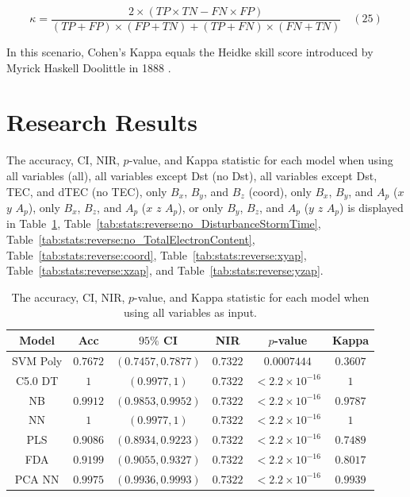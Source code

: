\documentclass[sn-mathphys-num]{sn-jnl}%
\begin{document}
\begin{equation}
	\kappa ={\frac{2\times (TP\times TN-FN\times FP)}{(TP+FP)\times (FP+TN)+(TP+FN)\times (FN+TN)}}
	\quad\left(25\right)
\end{equation}

In this scenario, Cohen's Kappa equals the Heidke skill score introduced by Myrick Haskell Doolittle in 1888 \cite{heidke1926berechnung, philosophical1887bulletin}.

\section{Research Results}
\label{sec:Results}

The accuracy, CI, NIR, $p$-value, and Kappa statistic for each model when using all variables (all), all variables except Dst (no Dst), all variables except Dst, TEC, and dTEC (no TEC), only $B_{x}$, $B_{y}$, and $B_{z}$ (coord), only $B_{x}$, $B_{y}$, and $A_{p}$ ($x$ $y$ $A_{p}$), only $B_{x}$, $B_{z}$, and $A_{p}$ ($x$ $z$ $A_{p}$), or only $B_{y}$, $B_{z}$, and $A_{p}$ ($y$ $z$ $A_{p}$) is displayed in Table~\ref{tab:stats:reverse:all}, Table~\ref{tab:stats:reverse:no_DisturbanceStormTime}, Table~\ref{tab:stats:reverse:no_TotalElectronContent}, Table~\ref{tab:stats:reverse:coord}, Table~\ref{tab:stats:reverse:xyap}, Table~\ref{tab:stats:reverse:xzap}, and Table~\ref{tab:stats:reverse:yzap}.

\begin{table}[!ht]
    \centering
    \caption{The accuracy, CI, NIR, $p$-value, and Kappa statistic for each model when using all variables as input.}
	\label{tab:stats:reverse:all}
	\begin{tabular}{|c|c|c|c|c|c|}
		\hline
		Model & Acc & $95\%$ CI & NIR & $p$-value & Kappa \\ \hline
		SVM Poly & $0.7672$ & $(0.7457, 0.7877)$ & $0.7322$ & $0.0007444$ & $0.3607$ \\ \hline
		C5.0 DT & $1$ & $(0.9977, 1)$ & $0.7322$ & $< 2.2 \times {10}^{-16}$ & $1$ \\ \hline
		NB & $0.9912$ & $(0.9853, 0.9952)$ & $0.7322$ & $< 2.2 \times {10}^{-16}$ & $0.9787$ \\ \hline
		NN & $1$ & $(0.9977, 1)$ & $0.7322$ & $< 2.2 \times {10}^{-16}$ & $1$ \\ \hline
		PLS & $0.9086$ & $(0.8934, 0.9223)$ & $0.7322$ & $< 2.2 \times {10}^{-16}$ & $0.7489$ \\ \hline
		FDA & $0.9199$ & $(0.9055, 0.9327)$ & $0.7322$ & $< 2.2 \times {10}^{-16}$ & $0.8017$ \\ \hline
		PCA NN & $0.9975$ & $(0.9936, 0.9993)$ & $0.7322$ & $< 2.2 \times {10}^{-16}$ & $0.9939$ \\ \hline
	\end{tabular}
\end{table}
\end{document}
